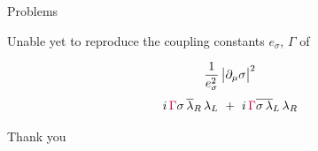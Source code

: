 \documentclass{beamer}
\begin{document}
\begin{frame}{Problems}
\begin{center}
	Unable yet to reproduce the coupling constants $ e_\sigma $, $ \Gamma $ of
\end{center}
\[
	\frac{1}{e_\sigma^2}\,\big|\partial_\mu\sigma\big|^2
\]
\[
	i\,\textcolor{purple}{\Gamma}\sigma\,\overline\lambda{}_R\,\lambda_L  ~+~
	i\,\textcolor{purple}{\Gamma}\overline{\sigma\,\lambda}{}_L\,\lambda_R
\]
\end{frame}




\begin{frame}{}

\fontsize{70pt}{70pt}\selectfont
\begin{center}
        Thank you
\end{center}

\end{frame}
\end{document}
